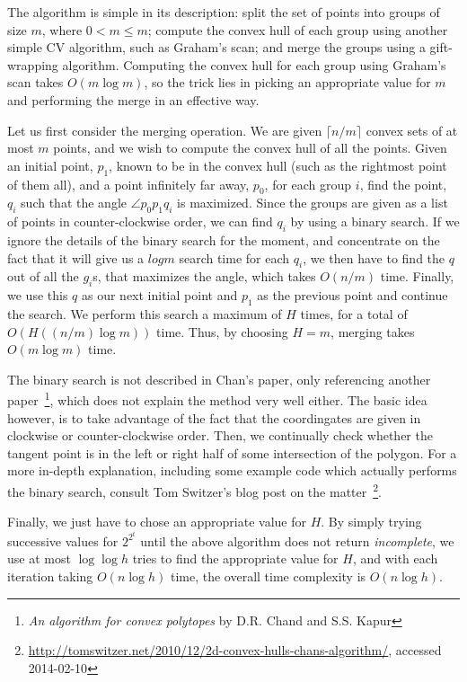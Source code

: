\documentclass[11pt,a4paper]{article}
\begin{document}
The algorithm is simple in its description: split the set of points
into groups of size $m$, where $0 < m \leq m$; compute the convex hull
of each group using another simple CV algorithm, such as Graham's
scan; and merge the groups using a gift-wrapping algorithm. Computing
the convex hull for each group using Graham's scan takes $O(m \log m)$, so
the trick lies in picking an appropriate value for $m$ and performing
the merge in an effective way.

Let us first consider the merging operation. We are given $\lceil n /
m \rceil$ convex sets of at most $m$ points, and we wish to compute
the convex hull of all the points. Given an initial point, $p_1$,
known to be in the convex hull (such as the rightmost point of them
all), and a point infinitely far away, $p_0$, for each group $i$, find
the point, $q_i$ such that the angle $\angle p_0 p_1 q_i$ is
maximized. Since the groups are given as a list of points in
counter-clockwise order, we can find $q_i$ by using a binary
search. If we ignore the details of the binary search for the moment,
and concentrate on the fact that it will give us a $log m$ search time
for each $q_i$, we then have to find the $q$ out of all the $g_i$s,
that maximizes the angle, which takes $O(n / m)$ time. Finally, we use
this $q$ as our next initial point and $p_1$ as the previous point and
continue the search. We perform this search a maximum of $H$ times,
for a total of $O(H((n / m) \log m))$ time. Thus, by choosing $H=m$,
merging takes $O(m \log m)$ time.

The binary search is not described in Chan's paper, only referencing
another paper~\footnote{\emph{An algorithm for convex polytopes} by
  D.R. Chand and S.S. Kapur}, which does not explain the method very
well either. The basic idea however, is to take advantage of the fact
that the coordingates are given in clockwise or counter-clockwise
order. Then, we continually check whether the tangent point is in the
left or right half of some intersection of the polygon. For a more
in-depth explanation, including some example code which actually
performs the binary search, consult Tom Switzer's blog post on the
matter~\footnote{\url{http://tomswitzer.net/2010/12/2d-convex-hulls-chans-algorithm/},
  accessed 2014-02-10}.

Finally, we just have to chose an appropriate value for $H$. By simply
trying successive values for $2^{2^t}$ until the above algorithm does
not return \emph{incomplete}, we use at most $\log \log h$ tries to find
the appropriate value for $H$, and with each iteration taking $O(n \log
h)$ time, the overall time complexity is $O(n \log h)$.
\end{document}
